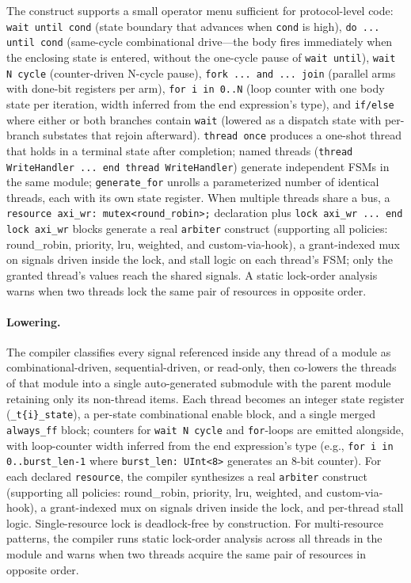 \documentclass[11pt,twocolumn]{article}
\begin{document}
The construct supports a small operator menu sufficient for protocol-level code: \texttt{wait until cond} (state boundary that advances when \texttt{cond} is high), \texttt{do ... until cond} (same-cycle combinational drive---the body fires immediately when the enclosing state is entered, without the one-cycle pause of \texttt{wait until}), \texttt{wait N cycle} (counter-driven N-cycle pause), \texttt{fork ... and ... join} (parallel arms with done-bit registers per arm), \texttt{for i in 0..N} (loop counter with one body state per iteration, width inferred from the end expression's type), and \texttt{if/else} where either or both branches contain \texttt{wait} (lowered as a dispatch state with per-branch substates that rejoin afterward). \texttt{thread once} produces a one-shot thread that holds in a terminal state after completion; named threads (\texttt{thread WriteHandler ... end thread WriteHandler}) generate independent FSMs in the same module; \texttt{generate\_for} unrolls a parameterized number of identical threads, each with its own state register. When multiple threads share a bus, a \texttt{resource axi\_wr: mutex<round\_robin>;} declaration plus \texttt{lock axi\_wr ... end lock axi\_wr} blocks generate a real \texttt{arbiter} construct (supporting all policies: round\_robin, priority, lru, weighted, and custom-via-hook), a grant-indexed mux on signals driven inside the lock, and stall logic on each thread's FSM; only the granted thread's values reach the shared signals. A static lock-order analysis warns when two threads lock the same pair of resources in opposite order.

\paragraph{Lowering.} The compiler classifies every signal referenced inside any thread of a module as combinational-driven, sequential-driven, or read-only, then co-lowers the threads of that module into a single auto-generated submodule with the parent module retaining only its non-thread items. Each thread becomes an integer state register (\texttt{\_t\{i\}\_state}), a per-state combinational enable block, and a single merged \texttt{always\_ff} block; counters for \texttt{wait N cycle} and \texttt{for}-loops are emitted alongside, with loop-counter width inferred from the end expression's type (e.g., \texttt{for i in 0..burst\_len-1} where \texttt{burst\_len: UInt<8>} generates an 8-bit counter). For each declared \texttt{resource}, the compiler synthesizes a real \texttt{arbiter} construct (supporting all policies: round\_robin, priority, lru, weighted, and custom-via-hook), a grant-indexed mux on signals driven inside the lock, and per-thread stall logic. Single-resource lock is deadlock-free by construction. For multi-resource patterns, the compiler runs static lock-order analysis across all threads in the module and warns when two threads acquire the same pair of resources in opposite order.
\end{document}
